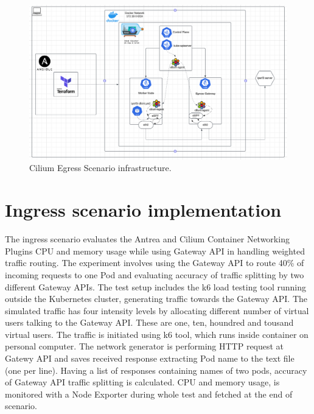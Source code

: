 \begin{figure}[tbh]
  \centering
  \includegraphics[width=1\columnwidth]{images/cilium_egress_gatateway_cluster.png}
  \caption{Cilium Egress Scenario infrastructure.}
  \label{fig:ciliumEgressGatewayScenarioArch}
\end{figure}

\section{Ingress scenario implementation}
\label{sec:ingressImpl}

The ingress scenario evaluates the Antrea and Cilium Container Networking Plugins CPU and memory usage while using Gateway API in handling weighted traffic routing. The experiment involves using the Gateway API to route 40\% of incoming requests to one Pod and evaluating accuracy of traffic splitting by two different Gateway APIs. The test setup includes the k6 load testing tool running outside the Kubernetes cluster, generating traffic towards the Gateway API. The simulated traffic has four intensity levels by allocating different number of virtual users talking to the Gateway API. These are one, ten, houndred and tousand virtual users. The traffic is initiated using k6 tool, which runs inside container on personal computer. The network generator is performing HTTP request at Gatewy API and saves received response extracting Pod name to the text file (one per line). Having a list of responses containing names of two pods, accuracy of Gateway API traffic splitting is calculated. CPU and memory usage, is monitored with a Node Exporter during whole test and fetched at the end of scenario.


